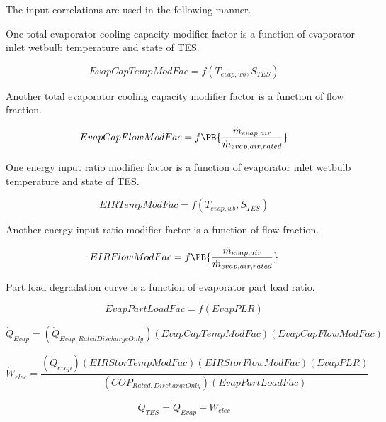 The input correlations are used in the following manner.

One total evaporator cooling capacity modifier factor is a function of evaporator inlet wetbulb temperature and state of TES.

\begin{equation}
EvapCapTempModFac = f\left( {{T_{evap,wb}},{S_{TES}}} \right)
\end{equation}

Another total evaporator cooling capacity modifier factor is a function of flow fraction.

\begin{equation}
EvapCapFlowModFac = f\PB{\frac{\dot{m}_{evap,air}}{\dot{m}_{evap,air,rated}}}
\end{equation}

One energy input ratio modifier factor is a function of evaporator inlet wetbulb temperature and state of TES.

\begin{equation}
EIRTempModFac = f\left( {{T_{evap,wb}},{S_{TES}}} \right)
\end{equation}

Another energy input ratio modifier factor is a function of flow fraction.

\begin{equation}
EIRFlowModFac = f\PB{\frac{\dot{m}_{evap,air}}{\dot{m}_{evap,air,rated}}}
\end{equation}

Part load degradation curve is a function of evaporator part load ratio.

\begin{equation}
EvapPartLoadFac = f\left( {EvapPLR} \right)
\end{equation}

\begin{equation}
{\dot Q_{Evap}} = \left( {{{\dot Q}_{Evap,RatedDischargeOnly}}} \right)\left( {EvapCapTempModFac} \right)\left( {EvapCapFlowModFac} \right)
\end{equation}

\begin{equation}
{\dot W_{elec}} = \frac{{\left( {{{\dot Q}_{evap}}} \right)\left( {EIRStorTempModFac} \right)\left( {EIRStorFlowModFac} \right)\left( {EvapPLR} \right)}}{{\left( {CO{P_{Rated,DischargeOnly}}} \right)\left( {EvapPartLoadFac} \right)}}
\end{equation}

\begin{equation}
{\dot Q_{TES}} = {\dot Q_{Evap}} + {\dot W_{elec}}
\end{equation}

